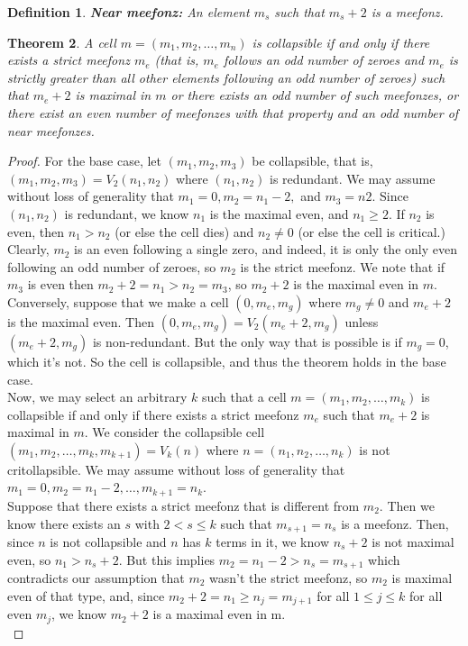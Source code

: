 \documentclass{amsart}
\newtheorem{theorem}{Theorem}[section]
\newtheorem{Definition}[theorem]{Definition}
\newenvironment{definition}{\begin{Definition}\normalfont}{\end{Definition}}
\begin{document}
\begin{definition}\label{meefonz}\textbf{Near meefonz:} An element $m_s$ such that $m_s+2$ is a meefonz. \end{definition}
\begin{theorem}\label{collapsible}A cell $m=(m_1,m_2,\ldots,m_n)$ is collapsible if and only if there exists a strict meefonz $m_e$ (that is, $m_e$ follows an odd number of zeroes and $m_e$ is strictly greater than all other elements following an odd number of zeroes) such that $m_e+2$ is maximal in $m$ or there exists an odd number of such meefonzes, or there exist an even number of meefonzes with that property and an odd number of near meefonzes.\end{theorem}
\begin{proof}For the base case, let $(m_1,m_2,m_3)$ be collapsible, that is, $(m_1,m_2,m_3)=V_2(n_1,n_2)$ where $(n_1,n_2)$ is redundant. We may assume without loss of generality that $m_1=0,m_2=n_1-2,$ and $m_3=n2$. Since $(n_1,n_2)$ is redundant, we know $n_1$ is the maximal even, and $n_1 \geq 2$. If $n_2$ is even, then $n_1>n_2$ (or else the cell dies) and $n_2 \neq 0$ (or else the cell is critical.) Clearly, $m_2$ is an even following a single zero, and indeed, it is only the only even following an odd number of zeroes, so $m_2$ is the strict meefonz. We note that if $m_3$ is even then $m_2+2=n_1>n_2=m_3$, so $m_2+2$ is the maximal even in $m$. \\
	Conversely, suppose that we make a cell $(0,m_e,m_g)$ where $m_g \neq 0$ and $m_e+2$ is the maximal even. Then $(0,m_e,m_g)=V_2(m_e+2,m_g)$ unless $(m_e+2,m_g)$ is non-redundant. But the only way that is possible is if $m_g=0$, which it's not. So the cell is collapsible, and thus the theorem holds in the base case. \\
	Now, we may select an arbitrary $k$ such that a cell $m=(m_1,m_2,\ldots,m_k)$ is collapsible if and only if there exists a strict meefonz $m_e$ such that $m_e+2$ is maximal in $m$. We consider the collapsible cell $(m_1,m_2,\ldots,m_k,m_{k+1})=V_k(n)$ where $n=(n_1,n_2,\ldots,n_k)$ is not critollapsible. We may assume without loss of generality that $m_1=0,m_2=n_1-2,\ldots,m_{k+1}=n_k$. \\
	Suppose that there exists a strict meefonz that is different from $m_2$. Then we know there exists an $s$ with $2 < s \leq k$ such that $m_{s+1}=n_s$ is a meefonz. Then, since $n$ is not collapsible and $n$ has $k$ terms in it, we know $n_s+2$ is not maximal even, so $n_1 > n_s+2$. But this implies $m_2=n_1-2 > n_s=m_{s+1}$ which contradicts our assumption that $m_2$ wasn't the strict meefonz, so $m_2$ is maximal even of that type, and, since $m_2+2=n_1 \geq n_j=m_{j+1}$ for all $1 \leq j \leq k$ for all even $m_j$, we know $m_2+2$ is a maximal even in m. \\

\end{proof}
\end{document}
